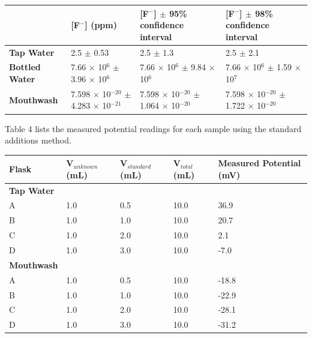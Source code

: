 \documentclass{article}
\begin{document}
\begin{center}
    \begin{tabular}{|L|L|L|L|}
        \hline
        & [F$^-$] (ppm) & [F$^-$] $\pm$ 95\% confidence interval & [F$^-$] $\pm$ 98\% confidence interval \\
        \hline
        \textbf{Tap Water}& 2.5 $\pm$ 0.53 & 2.5 $\pm$ 1.3 & 2.5 $\pm$ 2.1 \\
        \hline
        \textbf{Bottled Water} & 7.66 $\times$ 10$^6$ \hspace{2cm} $\pm$ 3.96 $\times$ 10$^6$ & 
        7.66 $\times$ 10$^6$ \hspace{2cm} $\pm$ 9.84 $\times$ 10$^6$ & 
        7.66 $\times$ 10$^6$ \hspace{2cm} $\pm$ 1.59 $\times$ 10$^7$ \\
        \hline
        \textbf{Mouthwash} & 7.598 $\times$ 10$^{-20}$ \hspace{2cm} $\pm$ 4.283 $\times$ 10$^{-21}$ & 
        7.598 $\times$ 10$^{-20}$ \hspace{2cm} $\pm$ 1.064 $\times$ 10$^{-20}$ & 
        7.598 $\times$ 10$^{-20}$ \hspace{2cm} $\pm$ 1.722 $\times$ 10$^{-20}$ \\
        \hline
    \end{tabular}
\end{center}
\newpage
Table 4 lists the measured potential readings for each sample using the standard
additions method.
\begin{center}
    \begin{tabular}{|L|L|L|L|L|}
        \hline
        Flask & V$_{unknown}$ (mL) & V$_{standard}$ (mL) & V$_{total}$ (mL) & Measured Potential (mV) \\
        \hline
        \textbf{Tap Water} & & & & \\
        \hline
        A & 1.0 & 0.5 & 10.0 & 36.9 \\
        B & 1.0 & 1.0 & 10.0 & 20.7 \\
        C & 1.0 & 2.0 & 10.0 & 2.1 \\
        D & 1.0 & 3.0 & 10.0 & -7.0 \\
        \hline
        \textbf{Mouthwash} & & & & \\
        \hline
        A & 1.0 & 0.5 & 10.0 & -18.8 \\
        B & 1.0 & 1.0 & 10.0 & -22.9 \\
        C & 1.0 & 2.0 & 10.0 & -28.1 \\
        D & 1.0 & 3.0 & 10.0 & -31.2 \\
        \hline
    \end{tabular}
\end{center}
\end{document}
